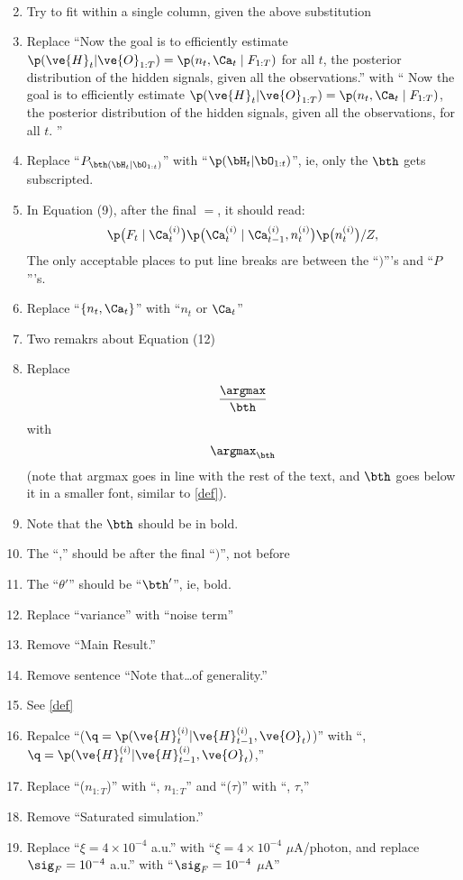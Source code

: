 \begin{enumerate}
\begin{align*}
\end{align*}
\item Try to fit within a single column, given the above substitution
\itb
\item Replace ``Now the goal is to efficiently estimate $\p(\ve{H}_t | \ve{O}_{1:T})=\p(n_t, \Ca_t \mid F_{1:T})$  for all $t$, the posterior distribution of the hidden signals, given all the observations.'' with `` Now the goal is to efficiently estimate $\p(\ve{H}_t | \ve{O}_{1:T})=\p(n_t, \Ca_t \mid F_{1:T})$, the posterior distribution of the hidden signals, given all the observations, for all $t$. ''
\item Replace ``$P_{\bth (\bH_t | \bO_{1:t})}$'' with ``$\p(\bH_t | \bO_{1:t})$'', ie, only the $\bth$ gets subscripted.
\item In Equation (9), after the final $=$, it should read: $$  \p \big( F_t \mid \Ca_t^{(i)} \big) \p \big( \Ca_t^{(i)}   \mid \Ca^{(i)}_{t-1}, n_t^{(i)} \big)  \p \big( n_t^{(i)} \big)/Z, $$  The only acceptable places to put line breaks are between the ``$)$'''s and ``$P$'''s.
\item Replace ``$\{n_t,\Ca_t\}$'' with ``$n_t$ or $\Ca_t$''
\item Two remakrs about Equation (12)
\ita
\item Replace $$\frac{\argmax}{\bth}$$ with $$\argmax_{\bth}$$ (note that argmax goes in line with the rest of the text, and $\bth$ goes below it in a smaller font, similar to \ref{def}).
\item Note that the $\bth$ should be in bold.
\item The ``,'' should be after the final ``$)$'', not before
\itb
\item The ``$\theta'$'' should be ``$\bth'$'', ie, bold.
\item Replace ``variance'' with ``noise term''
\item Remove ``Main Result.'' 
\item Remove sentence ``Note that\ldots of generality.''
\item See \ref{def}
\item Repalce ``($\q=\p(\ve{H}_t^{(i)} | \ve{H}_{t-1}^{(i)}, \ve{O}_t)$)'' with   ``, $\q=\p(\ve{H}_t^{(i)} | \ve{H}_{t-1}^{(i)}, \ve{O}_t)$,''
\item Replace ``($n_{1:T}$)'' with ``, $n_{1:T}$'' and ``($\tau$)'' with ``, $\tau$,''
\item Remove ``Saturated simulation.''
\item Replace ``$\xi=4 \times 10^{-4}$ a.u.'' with ``$\xi=4 \times 10^{-4}$ $\mu$A/photon, and replace $\sig_F=10^{-4}$ a.u.'' with ``$\sig_F=10^{-4}$ $\mu$A''

\end{enumerate}
